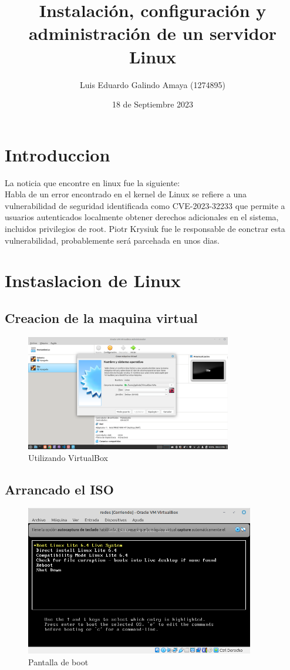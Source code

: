 \documentclass[11pt]{article}
\author{Luis Eduardo Galindo Amaya (1274895)}
\date{18 de Septiembre 2023}
\title{Instalación, configuración y administración de un servidor Linux}
\begin{document}
\tableofcontents
\pagebreak
{}

\section{Introduccion}
\label{sec:org4ee9eda}
La noticia que encontre en linux fue la siguiente: \\
Habla de un error encontrado en el kernel de Linux se refiere a una 
vulnerabilidad de seguridad identificada como CVE-2023-32233 que permite a 
usuarios autenticados localmente obtener derechos adicionales en el sistema, 
incluidos privilegios de root. Piotr Krysiuk fue le responsable de eonctrar 
esta vulnerabilidad, probablemente será parcehada en unos dias.

\section{Instaslacion de Linux}
\label{sec:orgf41260e}
\subsection{Creacion de la maquina virtual}
\label{sec:orgdf49aa6}
\begin{figure}[htbp]
\centering
\includegraphics[width=9cm]{img/Captura de pantalla de 2023-09-17 21-52-24.png}
\caption{Utilizando VirtualBox}
\end{figure}

\pagebreak

\subsection{Arrancado el ISO}
\label{sec:org96bfe3f}
\begin{figure}[htbp]
\centering
\includegraphics[width=10cm]{img/Captura de pantalla de 2023-09-17 21-54-09.png}
\caption{Pantalla de boot}
\end{figure}
\end{document}
